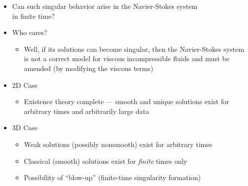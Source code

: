 \documentclass{beamer}
\def\Bmp#1{ \begin{minipage}{#1} }
\def\Emp{ \end{minipage} }
\begin{document}
\frame
{
\hspace*{-1.0cm}
\Bmp{12cm}
\raggedright

\begin{itemize}
\item<1->
Can such singular behavior arise in the Navier-Stokes system \\ in finite time?
\medskip 

\item<2->
Who cares?
\begin{itemize}
\item<3-> Well, if its solutions can become singular, then the
  Navier-Stokes system is not a correct model for viscous
  incompressible fluids and must be amended (by modifying the viscous
  terms)
\end{itemize}
\medskip 

\item<4->
2D Case
\begin{itemize}
\item<4->
Existence theory complete --- smooth and unique solutions exist for
arbitrary times and arbitrarily large data
\end{itemize}
\medskip 

\item<5->
3D Case
\begin{itemize}
\item<5->
Weak solutions (possibly nonsmooth) exist for arbitrary times
\smallskip 

\item<6->
Classical (smooth) solutions exist for {\it finite} times only 
\smallskip 

\item<7->
Possibility of ``blow-up'' (finite-time singularity formation)
\end{itemize}


\end{itemize}

\Emp
}




\end{document}
